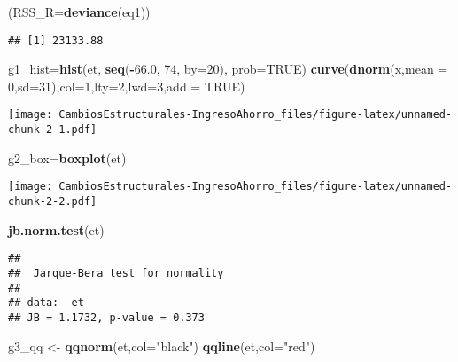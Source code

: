 \documentclass[
]{article}
\newenvironment{Shaded}{\begin{snugshade}}{\end{snugshade}}
\newcommand{\DataTypeTok}[1]{\textcolor[rgb]{0.13,0.29,0.53}{#1}}
\newcommand{\DecValTok}[1]{\textcolor[rgb]{0.00,0.00,0.81}{#1}}
\newcommand{\FloatTok}[1]{\textcolor[rgb]{0.00,0.00,0.81}{#1}}
\newcommand{\KeywordTok}[1]{\textcolor[rgb]{0.13,0.29,0.53}{\textbf{#1}}}
\newcommand{\NormalTok}[1]{#1}
\newcommand{\OperatorTok}[1]{\textcolor[rgb]{0.81,0.36,0.00}{\textbf{#1}}}
\newcommand{\OtherTok}[1]{\textcolor[rgb]{0.56,0.35,0.01}{#1}}
\newcommand{\StringTok}[1]{\textcolor[rgb]{0.31,0.60,0.02}{#1}}
\begin{document}
\begin{Shaded}
\begin{Highlighting}[]
\NormalTok{(}\DataTypeTok{RSS_R=}\KeywordTok{deviance}\NormalTok{(eq1))}
\end{Highlighting}
\end{Shaded}

\begin{verbatim}
## [1] 23133.88
\end{verbatim}

\begin{Shaded}
\begin{Highlighting}[]
\NormalTok{g1_hist=}\KeywordTok{hist}\NormalTok{(et, }\KeywordTok{seq}\NormalTok{(}\OperatorTok{-}\FloatTok{66.0}\NormalTok{, }\DecValTok{74}\NormalTok{, }\DataTypeTok{by=}\DecValTok{20}\NormalTok{), }\DataTypeTok{prob=}\OtherTok{TRUE}\NormalTok{)}
\KeywordTok{curve}\NormalTok{(}\KeywordTok{dnorm}\NormalTok{(x,}\DataTypeTok{mean =} \DecValTok{0}\NormalTok{,}\DataTypeTok{sd=}\DecValTok{31}\NormalTok{),}\DataTypeTok{col=}\DecValTok{1}\NormalTok{,}\DataTypeTok{lty=}\DecValTok{2}\NormalTok{,}\DataTypeTok{lwd=}\DecValTok{3}\NormalTok{,}\DataTypeTok{add =} \OtherTok{TRUE}\NormalTok{)}
\end{Highlighting}
\end{Shaded}

\texttt{[image: CambiosEstructurales-IngresoAhorro\_files/figure-latex/unnamed-chunk-2-1.pdf]}

\begin{Shaded}
\begin{Highlighting}[]
\NormalTok{g2_box=}\KeywordTok{boxplot}\NormalTok{(et)}
\end{Highlighting}
\end{Shaded}

\texttt{[image: CambiosEstructurales-IngresoAhorro\_files/figure-latex/unnamed-chunk-2-2.pdf]}

\begin{Shaded}
\begin{Highlighting}[]
\KeywordTok{jb.norm.test}\NormalTok{(et)}
\end{Highlighting}
\end{Shaded}

\begin{verbatim}
## 
##  Jarque-Bera test for normality
## 
## data:  et
## JB = 1.1732, p-value = 0.373
\end{verbatim}

\begin{Shaded}
\begin{Highlighting}[]
\NormalTok{g3_qq <-}\StringTok{ }\KeywordTok{qqnorm}\NormalTok{(et,}\DataTypeTok{col=}\StringTok{"black"}\NormalTok{)}
\KeywordTok{qqline}\NormalTok{(et,}\DataTypeTok{col=}\StringTok{"red"}\NormalTok{)}
\end{Highlighting}
\end{Shaded}
\end{document}
